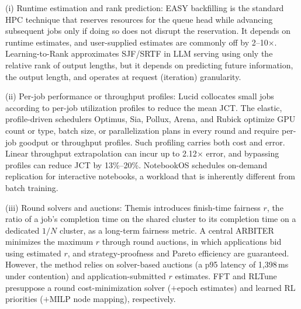 \documentclass{ieeetj}
\begin{document}
(i) Runtime estimation and rank prediction: EASY backfilling\cite{mualem2001backfilling} is the standard HPC technique that reserves resources for the queue head while advancing subsequent jobs only if doing so does not disrupt the reservation. It depends on runtime estimates, and user-supplied estimates are commonly off by 2–10$\times$. Learning-to-Rank\cite{fu2024efficient} approximates SJF/SRTF in LLM serving using only the relative rank of output lengths, but it depends on predicting future information, the output length, and operates at request (iteration) granularity.

(ii) Per-job performance or throughput profiles: Lucid\cite{b5} collocates small jobs according to per-job utilization profiles to reduce the mean JCT. The elastic, profile-driven schedulers Optimus\cite{peng2018optimus}, Sia\cite{b4}, Pollux\cite{qiao2021pollux}, Arena\cite{arena2026}, and Rubick\cite{rubick2025} optimize GPU count or type, batch size, or parallelization plans in every round and require per-job goodput or throughput profiles. Such profiling carries both cost and error. Linear throughput extrapolation can incur up to 2.12$\times$ error, and bypassing profiles can reduce JCT by 13\%--20\%\cite{schedmate2025}. NotebookOS\cite{notebookos2026} schedules on-demand replication for interactive notebooks, a workload that is inherently different from batch training.

(iii) Round solvers and auctions: Themis\cite{mahajan2020themis} introduces finish-time fairness $r$, the ratio of a job's completion time on the shared cluster to its completion time on a dedicated $1/N$ cluster, as a long-term fairness metric. A central ARBITER minimizes the maximum $r$ through round auctions, in which applications bid using estimated $r$, and strategy-proofness and Pareto efficiency are guaranteed. However, the method relies on solver-based auctions (a p95 latency of 1,398\,ms under contention) and application-submitted $r$ estimates. FFT\cite{fft2025} and RLTune\cite{rltune2025} presuppose a round cost-minimization solver ($+$epoch estimates) and learned RL priorities ($+$MILP node mapping), respectively.
\end{document}
